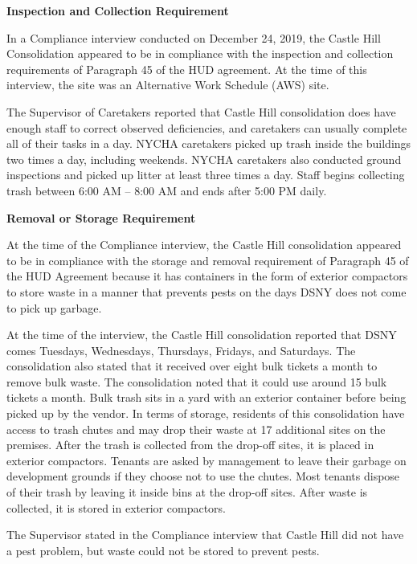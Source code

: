
\textbf{Inspection and Collection Requirement} 

 

In a Compliance interview conducted on December 24, 2019, the Castle Hill Consolidation appeared to be in compliance with the inspection and collection requirements of Paragraph 45 of the HUD agreement. At the time of this interview, the site was an Alternative Work Schedule (AWS) site.

 

The Supervisor of Caretakers reported that Castle Hill consolidation does have enough staff to correct observed deficiencies, and caretakers  can usually complete all of their tasks in a day. NYCHA caretakers picked up trash inside the buildings two times a day, including weekends. NYCHA caretakers also conducted ground inspections and picked up litter at least three times a day. Staff begins collecting trash between 6:00 AM -- 8:00 AM and ends after 5:00 PM daily.

\textbf{Removal or Storage Requirement} 

 

At the time of the Compliance interview, the Castle Hill consolidation appeared to be in compliance with the storage and removal requirement of Paragraph 45 of the HUD Agreement because it has containers in the form of exterior compactors to store waste in a manner that prevents pests on the days DSNY does not come to pick up garbage. 

  

At the time of the interview, the Castle Hill consolidation reported that DSNY comes Tuesdays, Wednesdays, Thursdays, Fridays, and Saturdays. The consolidation also stated that it received over eight bulk tickets a month to remove bulk waste. The consolidation noted that it could use around 15 bulk tickets a month. Bulk trash sits in a yard with an exterior container before being picked up by the vendor. In terms of storage, residents of this consolidation have access to trash chutes and may drop their waste at 17 additional sites on the premises. After the trash is collected from the drop-off sites, it is placed in exterior compactors. Tenants are asked by management to leave their garbage on development grounds if they choose not to use the chutes. Most tenants dispose of their trash by leaving it inside bins at the drop-off sites. After waste is collected, it is stored in exterior compactors. 

 

The Supervisor stated in the Compliance interview that Castle Hill did not have a pest problem, but waste could not be stored to prevent pests.

